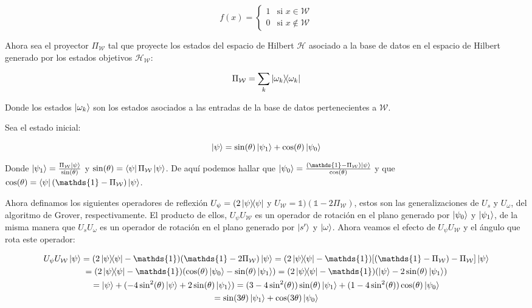 \begin{equation}
    f(x) =
    \begin{cases}
        1 & \text{si } x \in \mathcal{W} \\
        0 & \text{si } x \not\in \mathcal{W}
    \end{cases}
\end{equation}

Ahora sea el proyector $\Pi_\mathcal{W}$ tal que proyecte los estados del espacio de Hilbert $\mathcal{H}$ asociado a la base de datos en el espacio de Hilbert generado por los estados objetivos $\mathcal{H}_\mathcal{W}$:

\begin{equation}
    \Pi_\mathcal{W} = \sum\limits_k \ketbra{\omega_k}{\omega_k}
\end{equation}

Donde los estados $\ket{\omega_k}$ son los estados asociados a las entradas de la base de datos pertenecientes a $\mathcal{W}$.

Sea el estado inicial:

\begin{equation}
    \ket{\psi} = \sin(\theta) \ket{\psi_1} + \cos(\theta) \ket{\psi_0}
\end{equation}

Donde $\ket{\psi_1} = \frac{\Pi_\mathcal{W} \ket{\psi}}{\sin(\theta)}$ y $\sin(\theta) = \bra{\psi} \Pi_\mathcal{W} \ket{\psi}$. De aquí podemos hallar que $\ket{\psi_0} = \frac{(\mathds{1} - \Pi_\mathcal{W}) \ket{\psi}}{\cos(\theta)}$ y que $\cos(\theta) = \bra{\psi} (\mathds{1} - \Pi_\mathcal{W}) \ket{\psi}$.

Ahora definamos los siguientes operadores de reflexión $U_\psi = (2 \ketbra{\psi}{\psi}$ y $ U_\mathcal{W} = \mathds{1})(\mathds{1} - 2 \Pi_\mathcal{W})$, estos son las generalizaciones de $U_s$ y $U_\omega$, del algoritmo de Grover, respectivamente. El producto de ellos, $U_\psi U_\mathcal{W}$ es un operador de rotación en el plano generado por $\ket{\psi_0}$ y $\ket{\psi_1}$, de la misma manera que $U_s U_\omega$ es un operador de rotación en el plano generado por $\ket{s^\prime}$ y $\ket{\omega}$. Ahora veamos el efecto de $U_\psi U_\mathcal{W}$ y el ángulo que rota este operador:

\begin{multline}
    U_\psi U_\mathcal{W} \ket{\psi} = (2 \ketbra{\psi}{\psi} - \mathds{1}) (\mathds{1} - 2 \Pi_\mathcal{W}) \ket{\psi} = (2 \ketbra{\psi}{\psi} - \mathds{1}) [(\mathds{1} - \Pi_\mathcal{W}) - \Pi_\mathcal{W}] \ket{\psi} \\
    = (2 \ketbra{\psi}{\psi} - \mathds{1}) (\cos(\theta) \ket{\psi_0} - \sin(\theta) \ket{\psi_1}) = (2 \ketbra{\psi}{\psi} - \mathds{1}) (\ket{\psi} - 2 \sin(\theta) \ket{\psi_1}) \\
    = \ket{\psi} + (- 4 \sin^2(\theta) \ket{\psi} + 2 \sin(\theta) \ket{\psi_1}) = (3 - 4 \sin^2(\theta)) \sin(\theta) \ket{\psi_1} + (1 - 4 \sin^2(\theta)) \cos(\theta) \ket{\psi_0} \\
    = \sin(3 \theta) \ket{\psi_1} + \cos(3 \theta) \ket{\psi_0}
    \label{eq:DTheta}
\end{multline}

